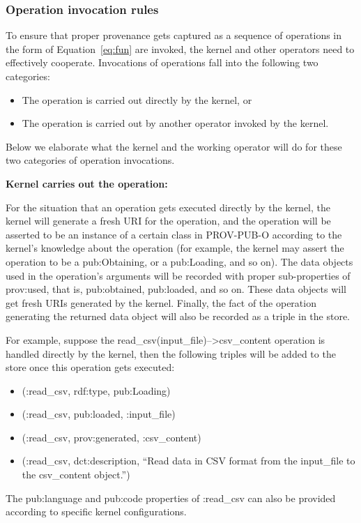 \subsubsection{Operation invocation rules}
To ensure that proper provenance gets captured as a sequence of operations in the form of Equation~\ref{eq:fun} are invoked, the kernel and other operators need to effectively cooperate. Invocations of operations fall into the following two categories:
\begin{itemize}
	\item The operation is carried out directly by the kernel, or
	\item The operation is carried out by another operator invoked by the kernel.
\end{itemize}
Below we elaborate what the kernel and the working operator will do for these two categories of operation invocations.

\noindent\textbf{Kernel carries out the operation:}

For the situation that an operation gets executed directly by the kernel, the kernel will generate a fresh URI for the operation, and the operation will be asserted to be an instance of a certain class in PROV-PUB-O according to the kernel's knowledge about the operation (for example, the kernel may assert the operation to be a pub:Obtaining, or a pub:Loading, and so on). The data objects used in the operation's arguments will be recorded with proper sub-properties of prov:used, that is, pub:obtained, pub:loaded, and so on. These data objects will get fresh URIs generated by the kernel. Finally, the fact of the operation generating the returned data object will also be recorded as a triple in the store.

For example, suppose the read\_csv(input\_file)-->csv\_content operation is handled directly by the kernel, then the following triples will be added to the store once this operation gets executed:
\begin{itemize}
	\item (:read\_csv, rdf:type, pub:Loading)
	\item (:read\_csv, pub:loaded, :input\_file)
	\item (:read\_csv, prov:generated, :csv\_content)
	\item (:read\_csv, dct:description, ``Read data in CSV format from the input\_file to the csv\_content object.'')
\end{itemize}
The pub:language and pub:code properties of :read\_csv can also be provided according to specific kernel configurations.

